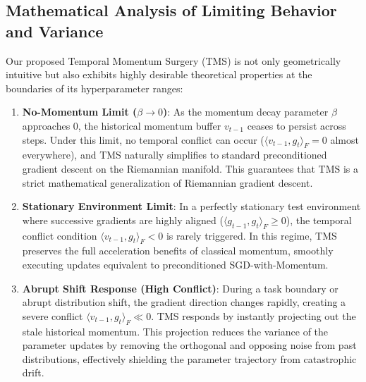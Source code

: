 \documentclass{article}
\theoremstyle{plain}
\theoremstyle{definition}
\theoremstyle{remark}
\begin{document}
\subsection{Mathematical Analysis of Limiting Behavior and Variance}
Our proposed Temporal Momentum Surgery (TMS) is not only geometrically intuitive but also exhibits highly desirable theoretical properties at the boundaries of its hyperparameter ranges:
\begin{enumerate}
    \item \textbf{No-Momentum Limit ($\beta \to 0$)}: As the momentum decay parameter $\beta$ approaches $0$, the historical momentum buffer $v_{t-1}$ ceases to persist across steps. Under this limit, no temporal conflict can occur ($\langle v_{t-1}, g_t \rangle_F = 0$ almost everywhere), and TMS naturally simplifies to standard preconditioned gradient descent on the Riemannian manifold. This guarantees that TMS is a strict mathematical generalization of Riemannian gradient descent.
    \item \textbf{Stationary Environment Limit}: In a perfectly stationary test environment where successive gradients are highly aligned ($\langle g_{t-1}, g_t \rangle_F \ge 0$), the temporal conflict condition $\langle v_{t-1}, g_t \rangle_F < 0$ is rarely triggered. In this regime, TMS preserves the full acceleration benefits of classical momentum, smoothly executing updates equivalent to preconditioned SGD-with-Momentum.
    \item \textbf{Abrupt Shift Response (High Conflict)}: During a task boundary or abrupt distribution shift, the gradient direction changes rapidly, creating a severe conflict $\langle v_{t-1}, g_t \rangle_F \ll 0$. TMS responds by instantly projecting out the stale historical momentum. This projection reduces the variance of the parameter updates by removing the orthogonal and opposing noise from past distributions, effectively shielding the parameter trajectory from catastrophic drift.
\end{enumerate}
\end{document}
